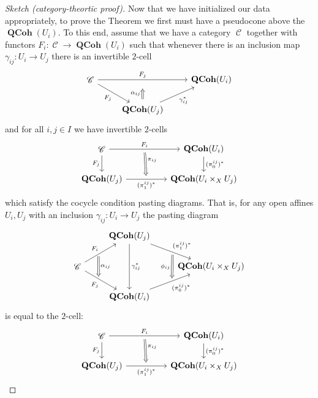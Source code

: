 \documentclass{amsart}
\theoremstyle{definition}
\DeclareMathOperator{\Cscr}{\mathscr{C}}
\DeclareMathOperator{\QCoh}{\mathbf{QCoh}}
\numberwithin{equation}{subsection}
\begin{document}
\begin{proof}[Sketch (category-theortic proof)]
	Now that we have initialized our data appropriately, to prove the Theorem we first must have a pseudocone above the $\QCoh(U_i)$. To this end, assume that we have a category $\Cscr$ together with functors $F_i:\Cscr \to \QCoh(U_i)$ such that whenever there is an inclusion map $\gamma_{ij}:U_i \to U_j$ there is an invertible $2$-cell
	\[
	\begin{tikzcd}
		\Cscr \ar[rr]{}{F_j} \ar[dr, swap]{}{F_j} & {} & \QCoh(U_i) \\
		& \QCoh(U_j) \ar[ur, swap]{}{\gamma_{ij}^{\ast}}
		\ar[from = 2-2, to = 1-2, Rightarrow, shorten <= 4pt, shorten >= 4pt]{}{\alpha_{ij}}
	\end{tikzcd}
	\] 
	and for all $i, j \in I$ we have invertible $2$-cells
	\[
	\begin{tikzcd}
		\Cscr \ar[rr, ""{name = U}]{}{F_i}	\ar[d, swap]{}{F_j} & & \QCoh(U_i)  \ar[d]{}{(\pi_{0}^{ij})^{\ast}} \\
		\QCoh(U_j) \ar[rr, swap, ""{name = D}]{}{(\pi_1^{ij})^{\ast}} & & \QCoh(U_i \times_X U_j)
		\ar[from = U, to = D, Rightarrow, shorten <= 4pt, shorten >= 4pt]{}{\pi_{ij}}
	\end{tikzcd}
	\]
	which satisfy the cocycle condition pasting diagrams. That is, for any open affines $U_i, U_j$ with an inclusion $\gamma_{ij}:U_i \to U_j$ the pasting diagram
	\[
	\begin{tikzcd}
		& \QCoh(U_j) \ar[dr, ""{name = UR}]{}{(\pi_{1}^{ij})^{\ast}} \ar[dd]{}{\gamma_{ij}^{\ast}} \\
		\Cscr \ar[ur, ""{name = UL}]{}{F_i} \ar[dr, swap, ""{name = DL}]{}{F_j}  & & \QCoh(U_i \times_{X} U_j) \\
		& \QCoh(U_i) \ar[ur, swap, ""{name = DR}]{}{(\pi_0^{ij})^{\ast}}
		\ar[from =UR, to = DR, swap, Rightarrow, shorten <= 4pt, shorten >= 4pt]{}{\phi_{ij}}
		\ar[from = UL, to = DL, Rightarrow, shorten <= 4pt, shorten >= 4pt]{}{\alpha_{ij}}
	\end{tikzcd}
	\]
	is equal to the $2$-cell:
	\[
	\begin{tikzcd}
		\Cscr \ar[rr, ""{name = U}]{}{F_i}	\ar[d, swap]{}{F_j} & & \QCoh(U_i)  \ar[d]{}{(\pi_{0}^{ij})^{\ast}} \\
		\QCoh(U_j) \ar[rr, swap, ""{name = D}]{}{(\pi_1^{ij})^{\ast}} & & \QCoh(U_i \times_X U_j)
		\ar[from = U, to = D, Rightarrow, shorten <= 4pt, shorten >= 4pt]{}{\pi_{ij}}
	\end{tikzcd}
	\]
	

\end{proof}
\end{document}
